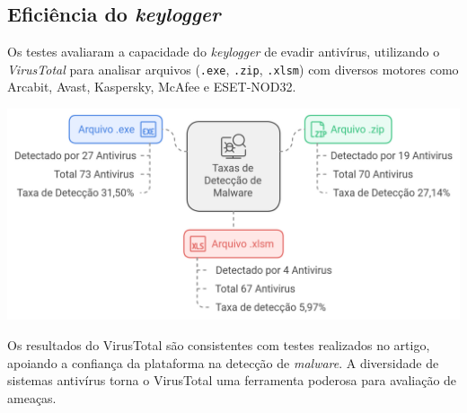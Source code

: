 \documentclass[12pt]{article}
\begin{document}
\subsection{Eficiência do \textit{keylogger}}
Os testes avaliaram a capacidade do \textit{keylogger} de evadir antivírus, utilizando o \textit{VirusTotal} para analisar arquivos (\texttt{.exe}, \texttt{.zip}, \texttt{.xlsm}) com diversos motores como Arcabit, Avast, Kaspersky, McAfee e ESET-NOD32.
\begin{center}
    \includegraphics[width=1\textwidth]{imgs/ViruzTotal.png} %
\end{center}
Os resultados do VirusTotal são consistentes com testes realizados no artigo, apoiando a confiança da plataforma na detecção de \textit{malware}. A diversidade de sistemas antivírus torna o VirusTotal uma ferramenta poderosa para avaliação de ameaças.
\end{document}
